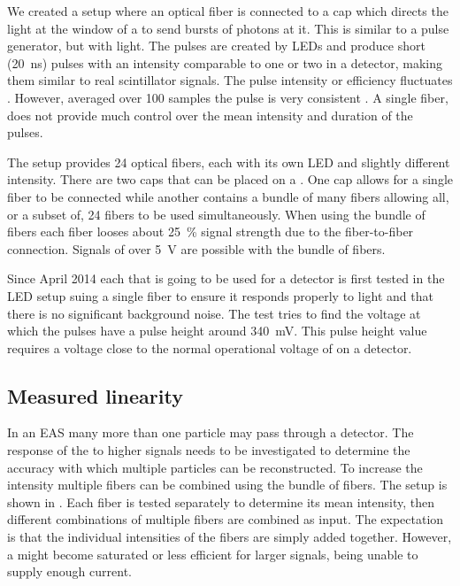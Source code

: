 We created a setup where an optical fiber is connected to a cap which
directs the light at the window of a \pmt to send bursts of photons at
it. This is similar to a pulse generator, but with light. The pulses are
created by LEDs and produce short (\SI{20}{\ns}) pulses with an
intensity comparable to one or two \mip in a detector, making them
similar to real scintillator signals. The pulse intensity or efficiency
fluctuates . However,
averaged over 100 samples the pulse is very consistent
. A single fiber,
does not provide much control over the mean intensity and duration of
the pulses.

The setup provides 24 optical fibers, each with its own LED and slightly
different intensity. There are two caps that can be placed on a \pmt.
One cap allows for a single fiber to be connected while another contains
a bundle of many fibers allowing all, or a subset of, 24 fibers to be
used simultaneously. When using the bundle of fibers each fiber looses about
\SI{25}{\percent} signal strength due to the fiber-to-fiber connection.
Signals of over \SI{5}{\volt} are possible with the bundle of fibers.

Since April 2014 each \pmt that is going to be used for a \hisparc
detector is first tested in the LED setup suing a single fiber to ensure
it responds properly to light and that there is no significant
background noise. The test tries to find the voltage at which the pulses
have a pulse height around \SI{340}{\milli\volt}. This pulse height
value requires a voltage close to the normal operational voltage of
\pmts on a \hisparc detector.


\subsection{Measured linearity}

In an EAS many more than one particle may pass through a detector. The
response of the \pmt to higher signals needs to be investigated to
determine the accuracy with which multiple particles can be
reconstructed. To increase the intensity multiple fibers can be combined
using the bundle of fibers. The setup is shown in . Each fiber is tested separately to determine
its mean intensity, then different combinations of multiple fibers are
combined as input. The expectation is that the individual intensities of
the fibers are simply added together. However, a \pmt might become
saturated or less efficient for larger signals, being unable to supply
enough current.

